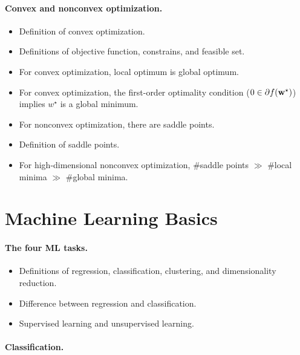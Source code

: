 \documentclass[11pt]{article}
\numberwithin{equation}{section}
\def\w{{\bf w}}
\begin{document}
\paragraph{Convex and nonconvex optimization.}


\begin{itemize}
	\item
	Definition of convex optimization.
	\item
	Definitions of objective function, constrains, and feasible set.
	\item
	For convex optimization, local optimum is global optimum.
	\item
	For convex optimization, the first-order optimality condition ($0 \in \partial f(\w^\star)$) implies $w^\star$ is a global minimum.
	\item
	For nonconvex optimization, there are saddle points.
	\item
	Definition of saddle points.
	\item
	For high-dimensional nonconvex optimization,
	\#saddle points $\gg $ \#local minima $\gg$ \#global minima.
\end{itemize}


\section{Machine Learning Basics}

\paragraph{The four ML tasks.}

\begin{itemize}
	\item
	Definitions of regression, classification, clustering, and dimensionality reduction.
	\item
	Difference between regression and classification.
	\item
	Supervised learning and unsupervised learning.
\end{itemize}





\paragraph{Classification.}
\end{document}
